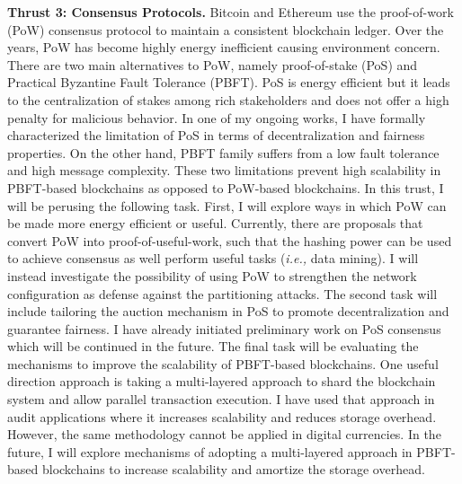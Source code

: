 \documentclass{NSF}
\newcommand{\BfPara}[1]{{\noindent\textbf{#1.}}\xspace}
\begin{document}
\BfPara{Thrust 3: Consensus Protocols} Bitcoin and Ethereum use the proof-of-work (PoW) consensus protocol to maintain a consistent blockchain ledger. Over the years, PoW has become highly energy inefficient causing environment concern. There are two main alternatives to PoW, namely proof-of-stake (PoS) and Practical Byzantine Fault Tolerance (PBFT). PoS is energy efficient but it leads to the centralization of stakes among rich stakeholders and does not offer a high penalty for malicious behavior. In one of my ongoing works, I have formally characterized the limitation of PoS in terms of decentralization and fairness properties. On the other hand, PBFT family suffers from a low fault tolerance and high message complexity. These two limitations prevent high scalability in PBFT-based blockchains as opposed to PoW-based blockchains. In this trust, I will be perusing the following task. First, I will explore ways in which PoW can be made more energy efficient or useful. Currently, there are proposals that convert PoW into proof-of-useful-work, such that the hashing power can be used to achieve consensus as well perform useful tasks ({\em i.e.,} data mining). I will instead investigate the possibility of using PoW to strengthen the network configuration as defense against the partitioning attacks. The second task will include tailoring the auction mechanism in PoS to promote decentralization and guarantee fairness. I have already initiated preliminary work on PoS consensus which will be continued in the future. The final task will be evaluating the mechanisms to improve the scalability of PBFT-based blockchains. One useful direction approach is taking a multi-layered approach to shard the blockchain system and allow parallel transaction execution. I have used that approach in audit applications where it increases scalability and reduces storage overhead. However, the same methodology cannot be applied in digital currencies.  In the future, I will explore mechanisms of adopting a multi-layered approach in PBFT-based blockchains to increase scalability and amortize the storage overhead. 
\end{document}
